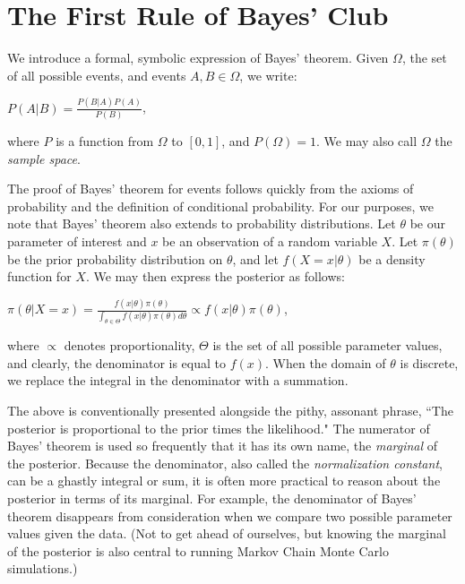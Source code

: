 \documentclass[12pt,twoside]{reedthesis}
\begin{document}
\section{The First Rule of Bayes' Club}

We introduce a formal, symbolic expression of Bayes' theorem. Given $\Omega$, the set of all possible events, and events $A, B \in \Omega$, we write:

\begin{center}
	$P(A | B) = \displaystyle\frac{P(B | A)P(A)}{P(B)}$,
\end{center}
where $P$ is a function from $\Omega$ to $[0,1]$, and $P(\Omega) = 1$. We may also call $\Omega$ the {\em sample space}.

	The proof of Bayes' theorem for events follows quickly from the axioms of probability and the definition of conditional probability. For our purposes, we note that Bayes' theorem also extends to probability distributions. Let $\theta$ be our parameter of interest and $x$ be an observation of a random variable $X$. Let $\pi(\theta)$ be the prior probability distribution on $\theta$, and let $f(X = x | \theta)$ be a density function for $X$. We may then express the posterior as follows:
\begin{center}
	$\pi(\theta | X = x) = \displaystyle\frac{f(x | \theta)\pi(\theta)}{\int_{\theta \in \Theta}f(x |\theta)\pi(\theta)d\theta} \propto f({x} | \theta)\pi(\theta)$,
\end{center}
where $\propto$ denotes proportionality, $\Theta$ is the set of all possible parameter values, and clearly, the denominator is equal to $f(x)$. When the domain of $\theta$ is discrete, we replace the integral in the denominator with a summation.

The above is conventionally presented alongside the pithy, assonant phrase, ``The posterior is proportional to the prior times the likelihood." The numerator of Bayes' theorem is used so frequently that it has its own name, the {\em marginal} of the posterior. Because the denominator, also called the {\em normalization constant}, can be a ghastly integral or sum, it is often more practical to reason about the posterior in terms of its marginal. For example, the denominator of Bayes' theorem disappears from consideration when we compare two possible parameter values given the data. (Not to get ahead of ourselves, but knowing the marginal of the posterior is also central to running Markov Chain Monte Carlo simulations.)
\end{document}
